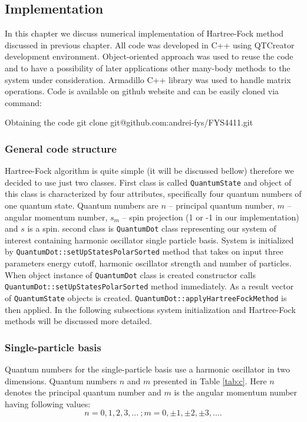\documentclass[10pt]{article}
\newcommand{\code}[1]{\colorbox{coding}{\texttt{#1}}}
\begin{document}
\subsection{Implementation}

In this chapter we discuss numerical implementation of Hartree-Fock method discussed in previous chapter.
All code was developed in C++ using QTCreator development environment. Object-oriented approach was used to reuse the code and to have a possibility of later applications other many-body methods to the system under consideration. Armadillo C++ library was used to handle matrix operations.
Code is available on github website and can be easily cloned via command:
\begin{pseudolisting}{Obtaining the code}
git clone git@github.com:andrei-fys/FYS4411.git
\end{pseudolisting}

\subsubsection{General code structure}
Hartree-Fock algorithm is quite simple (it will be discussed bellow) therefore we decided to use just two classes. First class is called \code{QuantumState} and object of this class is characterized by four attributes, specifically four quantum numbers of one quantum state. Quantum numbers are $n$ -- principal quantum number, $m$ -- angular momentum number, $s_m$ -- spin projection (1 or -1 in our implementation) and  $s$  is a spin. 
second class is \code{QuantumDot} class representing our system of interest containing harmonic oscillator single particle basis. System is initialized by \code{QuantumDot::setUpStatesPolarSorted} method that takes on input three parameters energy cutoff, harmonic oscillator strength and number of particles.
When object instance of \code{QuantumDot} class is created constructor calls \code{QuantumDot::setUpStatesPolarSorted} method immediately. As a result vector of \code{QuantumState} objects is created.
\code{QuantumDot::applyHartreeFockMethod} is then applied. In the following subsections system initialization and Hartree-Fock methods will be discussed more detailed.


\subsubsection{Single-particle basis}
Quantum numbers for the single-particle basis use a harmonic oscillator in two dimensions. Quantum numbers $n$ and $m$ presented in Table \ref{tab:c}.
Here $n$ denotes the principal quantum number and $m$ is the angular momentum number having following values:
\[
n = 0, 1, 2, 3, ... \ ;
m = 0, \pm 1, \pm 2, \pm 3, .... 
\]
\end{document}
